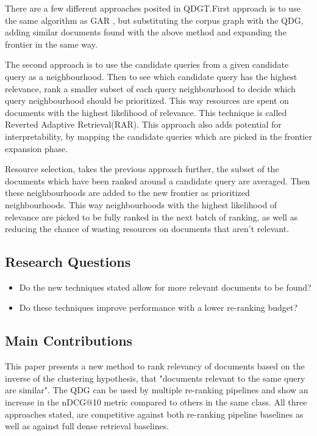 \documentclass[sigconf,authorversion,nonacm]{acmart}
\begin{document}
There are a few different approaches posited in QDGT\cite{query-document}.First approach is to use
the same algorithm as GAR\cite{gar} , but substituting the corpus graph with the QDG, adding similar
documents found with the above method and expanding the frontier in the same way.

The second approach is to use the candidate queries from a given candidate query as a neighbourhood.
Then to see which candidate query has the highest relevance, rank a smaller subset of each query
neighbourhood to decide which query neighbourhood should be prioritized. This way resources are
spent on documents with the highest likelihood of relevance. This technique is called Reverted
Adaptive Retrieval(RAR). This approach also adds potential for interpretability, by mapping the
candidate queries which are picked in the frontier expansion phase.

Resource selection, takes the previous approach further, the subset of the documents which have
been ranked around a candidate query are averaged. Then these neighbourhoods are added to the new
frontier as prioritized neighbourhoods. This way neighbourhoods with the highest likelihood of
relevance are picked to be fully ranked in the next batch of ranking, as well as reducing the chance
of wasting resources on documents that aren't relevant.

\subsection{Research Questions}

\begin{itemize}
	\item Do the new techniques stated allow for more relevant documents to be found?
	\item Do these techniques improve performance with a lower re-ranking budget?
\end{itemize}


\subsection{Main Contributions}

This paper presents a new method to rank relevancy of documents based on the inverse of the clustering
hypothesis, that "documents relevant to the same query are similar"\cite{query-document}. The QDG can be
used by multiple re-ranking pipelines and show an increase in the nDCG@10 metric compared to others
in the same class. All three approaches stated, are competitive against both re-ranking pipeline
baselines as well as against full dense retrieval baselines.
\end{document}
